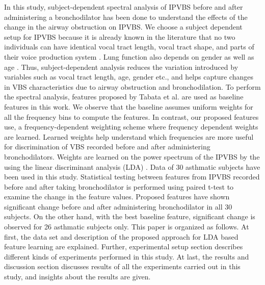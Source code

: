 \documentclass{article}
\begin{document}
In this study, subject-dependent spectral analysis of IPVBS before and after administering a bronchodilator has been done to understand the effects of the change in the airway obstruction on IPVBS. We choose a subject dependent setup for IPVBS because it is already known in the literature that no two individuals can have identical vocal tract length, vocal tract shape, and parts of their voice production system \cite{kinnunen2010overview}. Lung function also depends on gender \cite{gross2000relationship} as well as age \cite{john1986longitudinal} \cite{turner1968elasticity}. Thus, subject-dependent analysis reduces the variation introduced by variables such as vocal tract length, age, gender etc., and helps capture changes in VBS characteristics due to airway obstruction and bronchodilation. To perform the spectral analysis, features proposed by Tabata et al. \cite{tabata2018changes} are used as baseline features in this work. We observe that the baseline assumes uniform weights for all the frequency bins to compute the features. In contrast, our proposed features use, a frequency-dependent weighting scheme where frequency dependent weights are learned. Learned weights help understand which frequencies are more useful for discrimination of VBS recorded before and after administering bronchodilators. Weights are learned on the power spectrum of the IPVBS by the using the linear discriminant analysis (LDA) \cite{mika1999fisher}. Data of 30 asthmatic subjects have been used in this study. Statistical testing between features from IPVBS recorded before and after taking bronchodilator is performed using paired t-test \cite{kim2015t} to examine the change in the feature values. Proposed features have shown significant change before and after administering bronchodilator in all 30 subjects. On the other hand, with the best baseline \cite{tabata2018changes} feature, significant change is observed for 26 asthmatic subjects only.
This paper is organized as follows. At first, the data set and description of the proposed approach for LDA based feature learning are explained. Further, experimental setup section describes different kinds of experiments performed in this study. At last, the results and discussion section discusses results of all the experiments carried out in this study, and insights about the results are given.



\end{document}
